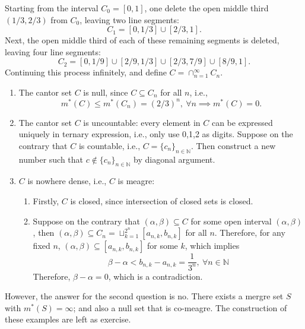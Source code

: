 \begin{example}
Starting from the interval $C_0=[0,1]$, one delete the open middle third $(1/3,2/3)$ from $C_0$, leaving two line segments: 
\[
C_1=[0,1/3]\cup[2/3,1].
\]
Next, the open middle third of each of these remaining segments is deleted, leaving four line segments:
\[
C_2=[0,1/9]\cup[2/9,1/3]\cup[2/3,7/9]\cup[8/9,1].
\]
Continuing this process infinitely, and define
$C=\cap_{n=1}^\infty C_n$.
\begin{enumerate}
\item
The cantor set $C$ is null, since $C\subseteq C_n$  for all $n$, i.e.,
\[
m^*(C)\le m^*(C_n) = (2/3)^n,\ \forall n\implies
m^*(C)=0.
\]
\item
The cantor set $C$ is uncountable:
every element in $C$ can be expressed uniquely in ternary expression, i.e., only use 0,1,2 as digits.
Suppose on the contrary that $C$ is countable, i.e., $C=\{c_n\}_{n\in\mathbb{N}}.$
Then construct a new number such that $c\notin \{c_n\}_{n\in\mathbb{N}}$ by diagonal argument.
\item
$C$ is nowhere dense, i.e., $C$ is meagre:
\begin{enumerate}
\item
Firstly, $C$ is closed, since intersection of closed sets is closed.
\item
Suppose on the contrary that $(\alpha,\beta)\subseteq C$ for some open interval $(\alpha,\beta)$, then 
$(\alpha,\beta)\subseteq C_n = \sqcup_{k=1}^{2^n}[a_{n,k},b_{n,k}]$ for all $n$.
Therefore, for any fixed $n$, $(\alpha,\beta)\subseteq[a_{n,k},b_{n,k}]$ for some $k$, which implies
\[
\beta-\alpha<b_{n,k} - a_{n,k}=\frac{1}{3^n},\ \forall n\in\mathbb{N}
\]
Therefore, $\beta-\alpha=0$, which is a contradiction.
\end{enumerate}
\end{enumerate}
\end{example}
\begin{remark}
However, the answer for the second question is no.
There exists a mergre set $S$ with $m^*(S)=\infty$; 
and also a null set that is co-meagre.
The construction of these examples are left as exercise.
\end{remark}

